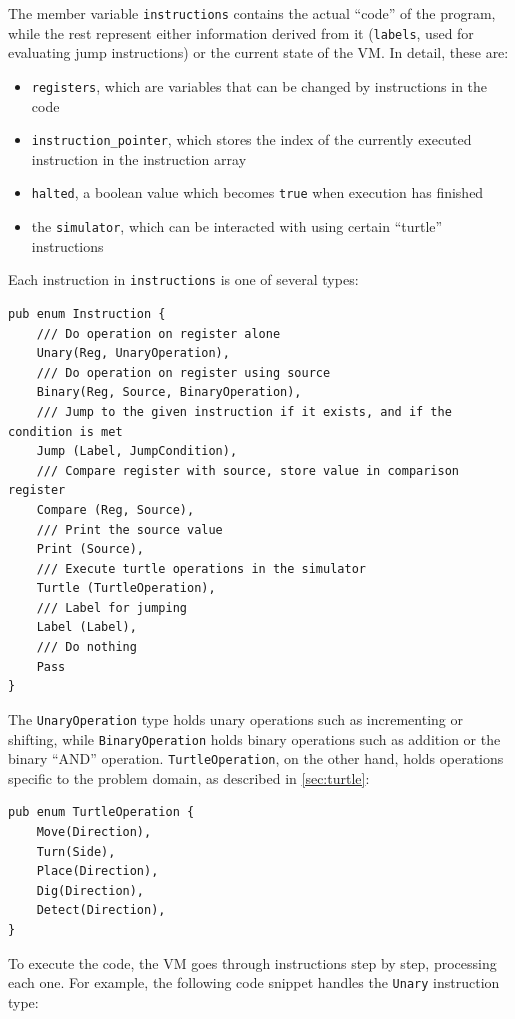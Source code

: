 \documentclass{report}
\begin{document}
The member variable \verb|instructions| contains the actual ``code'' of the program, while the rest represent either information derived from it (\verb|labels|, used for evaluating jump instructions) or the current state of the VM. In detail, these are:

\begin{itemize}
    \item \verb|registers|, which are variables that can be changed by instructions in the code
    \item \verb|instruction_pointer|, which stores the index of the currently executed instruction in the instruction array
    \item \verb|halted|, a boolean value which becomes \verb|true| when execution has finished
    \item the \verb|simulator|, which can be interacted with using certain ``turtle'' instructions
\end{itemize}

Each instruction in \verb|instructions| is one of several types:
\begin{verbatim}
pub enum Instruction {
    /// Do operation on register alone
    Unary(Reg, UnaryOperation),
    /// Do operation on register using source
    Binary(Reg, Source, BinaryOperation),
    /// Jump to the given instruction if it exists, and if the condition is met
    Jump (Label, JumpCondition),
    /// Compare register with source, store value in comparison register
    Compare (Reg, Source),
    /// Print the source value
    Print (Source),
    /// Execute turtle operations in the simulator
    Turtle (TurtleOperation),
    /// Label for jumping
    Label (Label),
    /// Do nothing
    Pass
}
\end{verbatim}

The \verb|UnaryOperation| type holds unary operations such as incrementing or shifting, while \verb|BinaryOperation| holds binary operations such as addition or the binary ``AND'' operation. \verb|TurtleOperation|, on the other hand, holds operations specific to the problem domain, as described in \autoref{sec:turtle}:

\begin{verbatim}
pub enum TurtleOperation {
    Move(Direction),
    Turn(Side),
    Place(Direction),
    Dig(Direction),
    Detect(Direction),
}
\end{verbatim}

To execute the code, the VM goes through instructions step by step, processing each one. For example, the following code snippet handles the \verb|Unary| instruction type:
\end{document}
